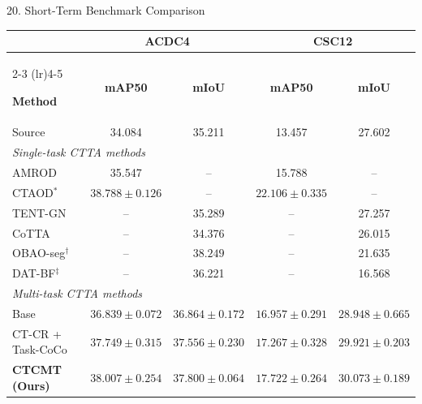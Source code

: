 \documentclass[aspectratio=169,11pt]{beamer}
\begin{document}
\begin{frame}{20. Short-Term Benchmark Comparison}

\scriptsize
\centering

\vspace{-0.12cm}

\setlength{\tabcolsep}{4.0pt}
\renewcommand{\arraystretch}{1.00}

\begin{tabular}{lcccc}
\toprule
&
\multicolumn{2}{c}{\textbf{ACDC4}}
&
\multicolumn{2}{c}{\textbf{CSC12}}
\\
\cmidrule(lr){2-3}
\cmidrule(lr){4-5}

\textbf{Method}
& \textbf{mAP50}
& \textbf{mIoU}
& \textbf{mAP50}
& \textbf{mIoU}
\\
\midrule

Source
& 34.084
& 35.211
& 13.457
& 27.602
\\

\midrule

\multicolumn{5}{l}{\textit{Single-task CTTA methods}} \\[-2pt]

AMROD
& 35.547
& --
& 15.788
& --
\\

CTAOD$^\ast$
& $\mathbf{38.788\pm0.126}$
& --
& $\mathbf{22.106\pm0.335}$
& --
\\

TENT-GN
& --
& 35.289
& --
& 27.257
\\

CoTTA
& --
& 34.376
& --
& 26.015
\\

OBAO-seg$^\dagger$
& --
& $\mathbf{38.249}$
& --
& 21.635
\\

DAT-BF$^\ddagger$
& --
& 36.221
& --
& 16.568
\\

\midrule

\multicolumn{5}{l}{\textit{Multi-task CTTA methods}} \\[-2pt]

Base
& $36.839\pm0.072$
& $36.864\pm0.172$
& $16.957\pm0.291$
& $28.948\pm0.665$
\\

CT-CR + Task-CoCo
& $37.749\pm0.315$
& $37.556\pm0.230$
& $17.267\pm0.328$
& $29.921\pm0.203$
\\

\textbf{CTCMT (Ours)}
& \underline{$38.007\pm0.254$}
& \underline{$37.800\pm0.064$}
& \underline{$17.722\pm0.264$}
& $\mathbf{30.073\pm0.189}$
\\


\end{tabular}
\end{frame}
\end{document}
